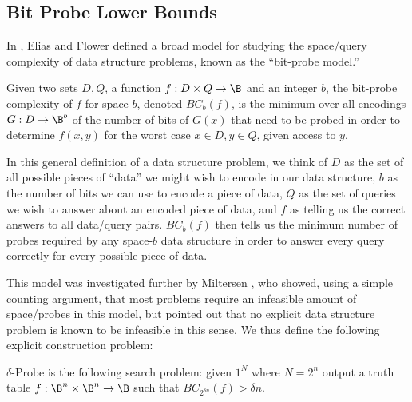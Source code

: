 \subsection{Bit Probe Lower Bounds}
In \cite{Elias-Flower}, Elias and Flower defined a broad model for studying the space/query complexity of data structure problems, known as the ``bit-probe model.''
\begin{definition}
Given two sets $D,Q$, a function $f: D \times Q \rightarrow \B$ and an integer $b$, the bit-probe complexity of $f$ for space $b$, denoted $BC_b(f)$, is the minimum over all encodings $G: D \rightarrow \B^b$ of the number of bits of $G(x)$ that need to be probed in order to determine $f(x,y)$ for the worst case $x \in D,y \in Q$, given access to $y$.
\end{definition}
In this general definition of a data structure problem, we think of $D$ as the set of all possible pieces of ``data'' we might wish to encode in our data structure, $b$ as the number of bits we can use to encode a piece of data, $Q$ as the set of queries we wish to answer about an encoded piece of data, and $f$ as telling us the correct answers to all data/query pairs. $BC_b(f)$ then tells us the minimum number of probes required by any space-$b$ data structure in order to answer every query correctly for every possible piece of data.

This model was investigated further by Miltersen \cite{Bro}, who showed, using a simple counting argument, that most problems require an infeasible amount of space/probes in this model, but pointed out that no explicit data structure problem is known to be infeasible in this sense. We thus define the following explicit construction problem:
\begin{definition}
{\sc $\delta$-Probe} is the following search problem: given $1^N$ where $N = 2^n$ output a truth table $f: \B^n \times \B^n \rightarrow \B$ such that $BC_{2^{\delta n}}(f) > \delta n$.
\end{definition}


